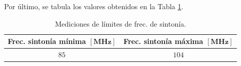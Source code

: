       Por último, se tabula los valores obtenidos en la Tabla \ref{tab:MedFrecSinto}.

        \begin{table}[H]
          \small
          \centering
          \begin{tabular}{c c}
              \toprule
              \textbf{Frec. sintonía mínima $\mathbf{[MHz]}$} &  \textbf{Frec. sintonía máxima $\mathbf{[MHz]}$} \\ 
              \midrule
              \(85\)   &   \(104\) \\ 
              \bottomrule
          \end{tabular}
          \caption{Mediciones de límites de frec. de sintonía.}
          \label{tab:MedFrecSinto}
        \end{table}

        